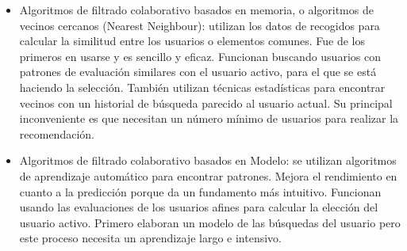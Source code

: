 \documentclass[preprint,12pt]{elsarticle}
\begin{document}
\begin{enumerate}[5.1]
	\begin{itemize}
	\item Algoritmos de filtrado colaborativo basados en memoria, o algoritmos de vecinos cercanos (Nearest Neighbour): utilizan los datos de recogidos para calcular la similitud entre los usuarios o elementos comunes. Fue de los primeros en usarse y es sencillo y eficaz. Funcionan buscando usuarios con patrones de evaluación similares con el usuario activo, para el que se está haciendo la selección. También utilizan técnicas estadísticas para encontrar vecinos con un historial de búsqueda parecido al usuario actual. Su principal inconveniente es que necesitan un número mínimo de usuarios para realizar la recomendación. \\
	\item Algoritmos de filtrado colaborativo basados en Modelo: se utilizan algoritmos de aprendizaje automático para encontrar patrones. Mejora el rendimiento en cuanto a la predicción porque da un fundamento más intuitivo. Funcionan usando las evaluaciones de los usuarios afines para calcular la elección del usuario activo. Primero elaboran un modelo de las búsquedas del usuario pero este proceso necesita un aprendizaje largo e intensivo.	\\
	\end{itemize}
	

\end{enumerate}
\end{document}
